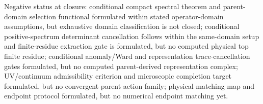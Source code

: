 \documentclass[11pt]{article}
\begin{document}
Negative status at closure: conditional compact spectral theorem and
parent-domain selection functional formulated within stated operator-domain
assumptions, but exhaustive domain classification is not closed; conditional
positive-spectrum determinant cancellation follows within the same-domain
setup and finite-residue extraction gate is formulated, but no computed
physical top finite residue;
conditional anomaly/Ward and representation trace-cancellation gates
formulated, but no computed parent-derived representation complex;
UV/continuum admissibility criterion and microscopic completion target
formulated, but no convergent parent action family; physical matching map and
endpoint protocol formulated, but no numerical endpoint matching yet.
\end{document}
